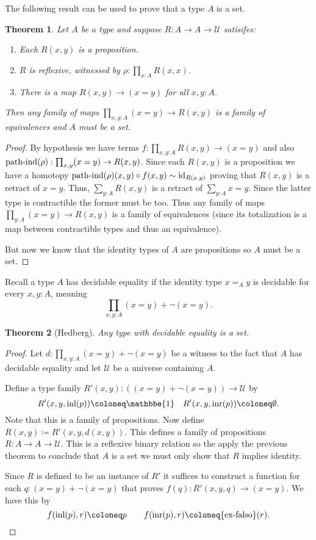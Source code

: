 \documentclass{amsart}
\theoremstyle{theorem}
\newtheorem*{thm}{Theorem}
\theoremstyle{definition}
\theoremstyle{remark}
\newcommand{\0}{\mathbbe{0}}
\newcommand{\1}{\mathbbe{1}}
\newcommand{\2}{\mathbbe{2}}
\newcommand{\3}{\mathbbe{3}}
\newcommand{\4}{\mathbbe{4}}
\newcommand{\term}[1]{{\textup{#1}}}
\newcommand{\id}{\term{id}}
\newcommand{\inl}{\term{inl}}
\newcommand{\inr}{\term{inr}}
\newcommand{\UU}{{\mathcal{U}}}
\begin{document}
The following result can be used to prove that a type $A$ is a set.

\begin{thm} Let $A$ be a type and suppose $R \colon A \to A \to \UU$ satisifes:
\begin{enumerate}
\item Each $R(x,y)$ is a proposition.
\item $R$ is reflexive, witnessed by $\rho : \prod_{x:A} R(x,x)$.
\item There is a map $R(x,y) \to (x=y)$ for all $x,y:A$.
\end{enumerate}
Then any family of maps $\prod_{x,y:A} (x=y) \to R(x,y)$ is a family of equivalences and $A$ must be a set.
\end{thm}
\begin{proof}
By hypothesis we have terms $f : \prod_{x,y:A} R(x,y) \to (x=y)$ and also $\term{path-ind}(\rho) : \prod_{x,y} (x=y) \to R(x,y)$. Since each $R(x,y)$ is a proposition we have a homotopy $\term{path-ind}(\rho)(x,y) \circ f(x,y) \sim \id_{R(x,y)}$ proving that $R(x,y)$ is a retract of $x=y$. Thus, $\sum_{y:A} R(x,y)$ is a retract of $\sum_{y:A} x=y$. Since the latter type is contractible the former must be too. Thus any family of maps $\prod_{y:A}(x=y) \to R(x,y)$ is a family of equivalences (since its totalization is a map between contractible types and thus an equivalence).

But now we know that the identity types of $A$ are propositions so $A$ must be a set.
\end{proof}

Recall a type $A$ has decidable equality  if the identity type $x=_Ay$ is decidable for every $x, y : A$, meaning
\[ \prod_{x,y:A} (x=y) + \neg (x=y).\]

\begin{thm}[Hedberg] Any type with decidable equality is a set.
\end{thm}
\begin{proof} Let $d : \prod_{x,y:A} (x=y) + \neg (x=y)$ be a witness to the fact that $A$ has decidable equality and let $\UU$ be a universe containing $A$.

Define a type family $R'(x,y) : ((x=y) +\neg(x=y)) \to \UU$ by
\[ R'(x,y, \inl(p)) \coloneq \1 \quad R'(x,y, \inr(p)) \coloneq \emptyset.\]
Note that this is a family of propositions. Now define $R(x,y) \coloneq R'(x,y,d(x,y))$. This defines a family of propositions $R : A \to A \to \UU$. This is a reflexive binary relation so the apply the previous theorem to conclude that $A$ is a set we must only show that $R$ implies identity.

Since $R$ is defined to be an instance of $R'$ it suffices to construct a function for each $q : (x=y) + \neg(x=y)$ that proves $f(q) : R'(x,y,q) \to (x=y)$. We have this by
\[ f(\inl(p),r) \coloneq p \qquad f(\inr(p),r) \coloneq \term{ex-falso}(r). \qedhere\]
\end{proof}
\end{document}
